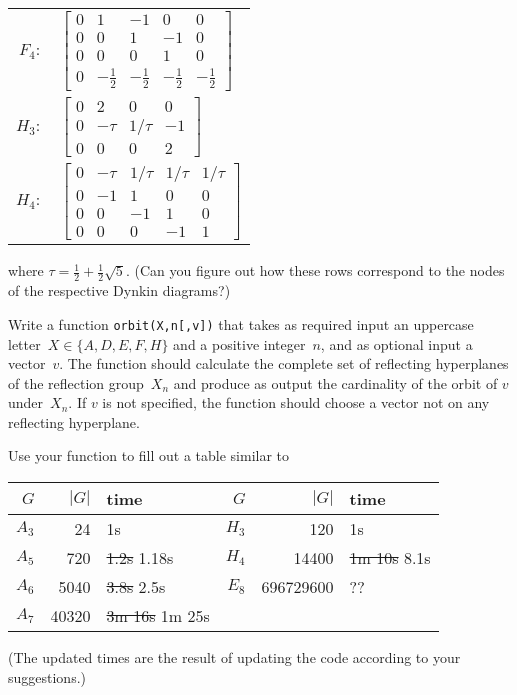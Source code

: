 \documentclass[11pt]{amsart}
\begin{document}
\begin{enumerate}
\begin{multicols}{2}
  \qquad\begin{tabular}[c]{rl}
  $F_4:$      
    &\small
    $\begin{bmatrix}
     0 & 1 & -1 & 0 & 0 \\
     0 & 0 & 1 & -1 & 0 \\
     0 & 0 & 0 & 1 & 0 \\
     0 & -\frac12 & -\frac12 & -\frac12 & -\frac12      
    \end{bmatrix}$
    \\[6ex]
    $H_3:$      
    &\small
    $\begin{bmatrix}
      0 & 2 & 0 & 0 \\
      0 & -\tau & 1/\tau & -1 \\
      0 & 0 & 0 & 2      
    \end{bmatrix}$
    \\[6ex]
    $H_4:$      
    &\small
    $\begin{bmatrix}
      0 & -\tau & 1/\tau & 1/\tau & 1/\tau \\
      0 & -1 & 1 & 0 & 0 \\
      0 & 0 & -1 & 1 & 0 \\
      0 & 0 & 0 & -1 & 1      
    \end{bmatrix}$
  \end{tabular}
\end{multicols}

\noindent where $\tau = \frac12 + \frac12\sqrt{5}$. (Can you figure out how these rows correspond to the nodes of the respective Dynkin diagrams?)

  Write a function \texttt{orbit(X,n[,v])} that takes as required input an uppercase letter~$X\in\{A,D,E,F,H\}$ and a positive integer~$n$, and as optional input a vector~$v$. The function should calculate the complete set of reflecting hyperplanes of the reflection group~$X_n$ and produce as output the cardinality of the orbit of $v$ under~$X_n$. If $v$ is not specified, the function should choose a vector not on any reflecting hyperplane.

Use your function to fill out a table similar to
\begin{center}
  \begin{tabular}[c]{r|r|l||r|r|l}
    $G$ & $|G|$ & time & $G$ & $|G|$ & time\\\hline
    $A_3$ & 24 & 1s & $H_3$ & 120 & 1s\\
    $A_5$ & 720 & \sout{1.2s} 1.18s & $H_4$ & 14400 & \sout{1m 10s} 8.1s\\
    $A_6$ & 5040 & \sout{3.8s} 2.5s & $E_8$ & 696729600 & ?? \\
    $A_7$ & 40320 & \sout{3m 16s} 1m 25s
  \end{tabular}
\end{center}
(The updated times are the result of updating the code according to your suggestions.)


\end{enumerate}
\end{document}
